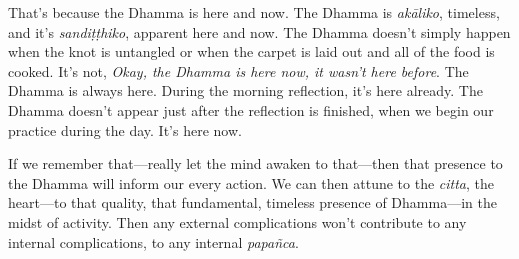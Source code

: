 That's because the Dhamma is here and now. The Dhamma is 
\emph{akāliko}, timeless, and it's \emph{sandiṭṭhiko}, apparent 
here and now. The Dhamma doesn't simply happen when the knot is 
untangled or when the carpet is laid out and all of the food is cooked. 
It's not, \emph{Okay, the Dhamma is here now, it wasn't here before}. 
The Dhamma is always here. During the morning reflection, it's here 
already. The Dhamma doesn't appear just after the reflection is 
finished, when we begin our practice during the day. It's here now.

If we remember that---really let the mind awaken to that---then that 
presence to the Dhamma will inform our every action. We can then attune 
to the \emph{citta}, the heart---to that quality, that fundamental, 
timeless presence of Dhamma---in the midst of activity. Then any 
external complications won't contribute to any internal complications, 
to any internal \emph{papañca}.

